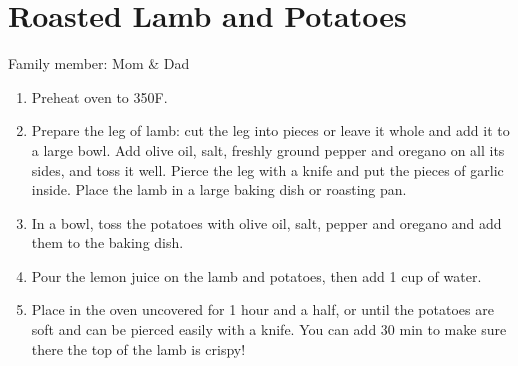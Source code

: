 \chapter{Roasted Lamb and Potatoes}
\label{ch:lambpotatoes}


Family member: Mom \& Dad

\begin{enumerate}
    \item Preheat oven to 350\degree F.
    \item Prepare the leg of lamb: cut the leg into pieces or leave it whole and add it to a large bowl.  Add olive oil, salt, freshly ground pepper and oregano on all its sides, and toss it well. Pierce the leg with a knife and put the pieces of garlic inside. Place the lamb in a large baking dish or roasting pan.
    \item In a bowl, toss the potatoes with olive oil, salt, pepper and oregano and add them to the baking dish.
    \item Pour the lemon juice on the lamb and potatoes, then add 1 cup of water.
    \item Place in the oven uncovered for 1 hour and a half, or until the potatoes are soft and can be pierced easily with a knife. You can add 30 min to make sure there the top of the lamb is crispy!
\end{enumerate}



